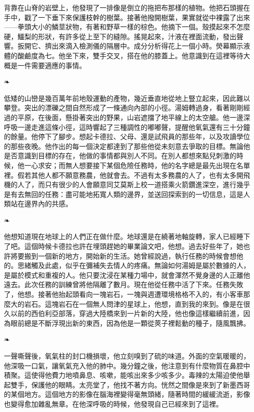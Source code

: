 \documentclass[10pt]{article}
\begin{document}
背靠在山脊的岩壁上，他發現了一排像是倒立的拖把布那樣的植物。他把石頭握在手中，戳了一下垂下來保護枝幹的樹葉。接著他撥開樹葉，果實就從中裸露了出來——拳頭大小的鱗莖狀物，有著和野草一樣的棕色。他摘下一個。殼摸起來不怎麼硬，鱷梨的形狀，有許多從上至下的縫隙。搖晃起來，汁液在裡面流動，發出聲響。扳開它、擠出來滴入檢測儀的隔層中。成分分析得花上一個小時。熒幕顯示液體的酸鹼度為七。他坐下來，雙手交叉，搭在他的膝蓋上。他意識到在這裡等待大概是一件需要適應的事情。

\begin{center}❧\end{center}

低矮的山巒是幾百萬年前地殼運動的產物，幾近垂直地從地上豎立起來，因此難以攀登。突出的漂礫之間自然形成了一條通向內部的小徑。湯姆轉過身，看著剛剛經過的平原，在後面，懸掛著突出的野果，山岩遮擋了地平線上的太空艙。他一邊深呼吸一邊走進這條小徑，這時響起了三種調性的嘟嘟聲，提醒他氧氣還有三十分鐘的餘量。他停下了腳步。想起卡德拉、父母、還是試飛員的那些年，以及攻讀學位的那些夜晚。他作出的每一個決定都達到了那些他從未刻意去爭取的目標。無論他是否意識到目標的存在，他做的事情都與別人不同。在別人都想來點兒刺激的時候，他一心求安；而無人想要接下某個危險任務時，他的名字總是最先出現在名單裡。假若其他人都不願意務農，他就會去。不過有太多務農的人了，也有太多開飛機的人了，而只有很少的人會願意同艾莫斯上校一道搭乘火箭鑽進深空，進行幾乎是有去無回的任務：盡可能地拓寬人類的邊界，並送回探索到的一切信息，這是人類站在邊界內的共感。

\begin{center}❧\end{center}

他想知道現在地球上的人們正在做什麼。地球還是在繞著地軸旋轉，家人已經睡下了吧。這個時候卡德拉也許在埋頭趕她的畢業論文吧，他想。過去好些年了，她也許將要搬到一個新的地方，開始新的生活。她曾經說過，執行任務的時候會想他的。思緒觸及此處，似乎在彌補失去情人的疼痛。無論如何湯姆是屬於數據的人，是屬於模式和重複的人。他只要沈浸在某種力場中，就會渾然不覺身邊的人正離他遠去。此次任務的訓練曾將他隔離了數月。現在他從任務中活了下來。任務失敗了，他想。接著他抬起頭看向一塊岩石，一塊與週遭環境格格不入的，有小客車那麼大的岩石。這塊岩石在一個無人問津的星球上，他想，直到我的來到。像是在很久以前的西伯利亞部落，穿過大陸橋來到一片新的大陸，他也像這樣繼續前進，因為眼前總是不斷浮現出新的東西，因為他是一顆從莢子裡鬆動的種子，隨風飄拂。

\begin{center}❧\end{center}

一聲嘶聲後，氧氣柱的封口機損壞，他立刻嗅到了硫的味道。外面的空氣暖暖的，他深吸一口氣，讓氧氣充入他的肺中。幾分鐘之後，他注意到有什麼物質在鼻腔中積聚。這使得他費力地噴鼻息、咳嗽，能咳出來多少咳多少。毒辣的太陽迫使他舉起雙手，保護他的眼睛。太亮堂了，他找不著方向。恍然之間像是來到了新墨西哥的某個地方。這個地方的影像在腦海裡變得毫無頭緒，隨著時間的緩緩流逝，影像也變得愈加雜亂無章。在他深呼吸的時候，他發現自己已經來到了這裡。
\end{document}
